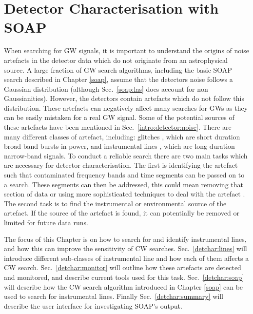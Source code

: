 \chapter{\label{detchar}Detector Characterisation with SOAP}

When searching for \gls{GW} signals, it is important to understand the origins
of noise artefacts in the detector data which do not originate from an
astrophysical source.  A large fraction of \gls{GW} search algorithms,
including the basic SOAP search described in Chapter \ref{soap}, assume that the detectors noise follows a Gaussian
distribution (although Sec.~\ref{soap:las} does account for non Gaussianities).  However, the detectors contain artefacts which do not follow
this distribution.  These artefacts can negatively affect many searches for
\glspl{GW} as they can be easily mistaken for a real \gls{GW} signal.  Some of
the potential sources of these artefacts have been mentioned in
Sec.~\ref{intro:detector:noise}.  There are many different classes of artefact,
including: glitches \citep{aasi2015CharacterizationLIGO,abbott2016CharacterizationTransienta}, which are short duration broad band bursts in
power, and instrumental lines \citep{covas2018IdentificationMitigation}, which are long duration narrow-band signals.  To conduct a
reliable search there are two main tasks which are necessary for detector
characterisation.  The first is identifying the artefact such that contaminated frequency bands and time segments can be passed on to a search.  These segments can then be addressed, this could mean removing that section of
data or using more sophisticated techniques to deal with the artefact
\citep{pankow2018MitigationInstrumental}.  The second task is to find the
instrumental or environmental source of the artefact.  If the source of the artefact is found, it can
potentially be removed or limited for future data runs.

The focus of this Chapter is on how to search for and identify instrumental lines, and how this can improve the sensitivity of \gls{CW} searches.
Sec.~\ref{detchar:lines} will introduce different sub-classes of instrumental line and how each of them affects a \gls{CW} search.
Sec.~\ref{detchar:monitor} will outline how these artefacts are detected and monitored, and describe current tools used for this task.
Sec.~\ref{detchar:soap} will describe how the \gls{CW} search algorithm
introduced in Chapter \ref{soap} can be used to search for instrumental lines.
Finally Sec.~\ref{detchar:summary} will describe the user interface for investigating SOAP's output.



